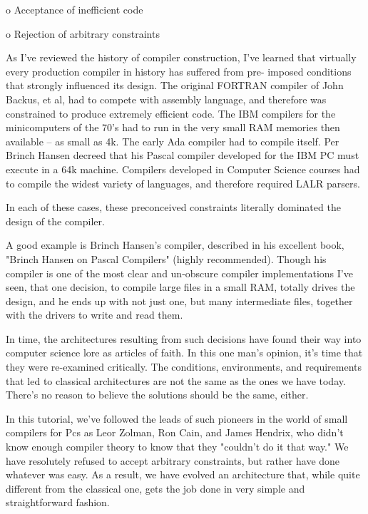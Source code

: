 \documentclass[float=false, crop=false]{standalone}
\begin{document}
o	Acceptance of inefficient code

o	Rejection of arbitrary constraints

As I've reviewed the history of compiler construction, I've learned that
virtually every production compiler in history has suffered from pre-
imposed conditions that strongly influenced its design. The original
FORTRAN compiler of John Backus, et al, had to compete with assembly
language, and therefore was constrained to produce extremely efficient
code.  The IBM compilers for the minicomputers of the 70's had to run in
the very small RAM memories then available -- as small as 4k.  The early
Ada compiler had to compile itself.  Per Brinch Hansen decreed that his
Pascal compiler developed for the IBM PC must execute in a 64k machine.
Compilers developed in Computer Science courses had to compile the
widest variety of languages, and therefore required LALR parsers.

In each of these cases, these preconceived constraints literally
dominated the design of the compiler.

A good example is Brinch Hansen's compiler, described in his excellent
book, "Brinch Hansen on Pascal Compilers" (highly recommended).  Though
his compiler is one of the most clear and un-obscure compiler
implementations I've seen, that one decision, to compile large files in
a small RAM, totally drives the design, and he ends up with not just
one, but many intermediate files, together with the drivers to write and
read them.

In time, the architectures resulting from such decisions have found
their way into computer science lore as articles of faith. In this one
man's opinion, it's time that they were re-examined critically.  The
conditions, environments, and requirements that led to classical
architectures are not the same as the ones we have today.  There's no
reason to believe the solutions should be the same, either.

In this tutorial, we've followed the leads of such pioneers in the world
of small compilers for Pcs as Leor Zolman, Ron Cain, and James Hendrix,
who didn't know enough compiler theory to know that they "couldn't do it
that way."  We have resolutely refused to accept arbitrary constraints,
but rather have done whatever was easy.  As a result, we have evolved an
architecture that, while quite different from the classical one, gets
the job done in very simple and straightforward fashion.
\end{document}
